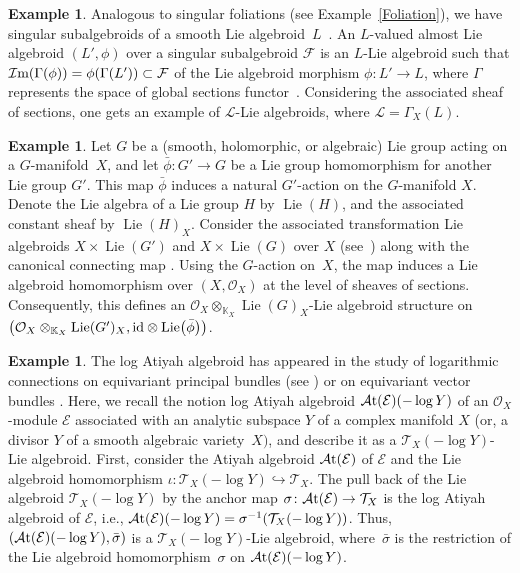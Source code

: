 \documentclass[pdftex]{sigma}
\numberwithin{equation}{section}
\theoremstyle{definition}
\newtheorem{Exm}[Thm]{Example}
\begin{document}
\begin{Exm}
Analogous to singular foliations (see Example~\ref{Foliation}), we have singular subalgebroids of a smooth Lie algebroid~$L$~\cite{MZ}.
An $L$-valued almost Lie algebroid $(L', \phi)$ over a singular subalgebroid $\mathcal{F}$ is
an $L$-Lie algebroid such that $\mathcal{I}{\rm m}(\Gamma(\phi))=\phi(\Gamma(L')) \subset \mathcal{F}$ of the Lie algebroid morphism $\phi\colon L' \rightarrow L$, where $\Gamma$ represents the space of global sections functor~\cite{RL25}. Considering the associated sheaf of sections, one gets an example of $\mathcal{L}$-Lie algebroids, where $\mathcal{L}=\Gamma_X(L)$.
\end{Exm}

\begin{Exm} \label{Lie groups}
Let $G$ be a (smooth, holomorphic, or algebraic) Lie group acting on a $G$-mani\-fold~$X$, and let $\bar{\phi}\colon G' \to G$ be a Lie group homomorphism for another Lie group $G'$. This map $\bar{\phi}$ induces a natural $G'$-action on the $G$-manifold $X$.
	Denote the Lie algebra of a Lie group $H$ by $\operatorname{Lie}(H)$, and the associated constant sheaf by $\operatorname{Lie}(H)_X$. Consider the associated transformation Lie algebroids $X \times \operatorname{Lie}(G')$ and $X \times \operatorname{Lie}(G)$ over $X$ (see~\cite{RF}) along with the canonical connecting map .
	Using the $G$-action on~$X$, the map \smash{$\tilde{\phi}$} induces a Lie algebroid homomorphism over $(X, \mathcal{O}_X)$ at the level of sheaves of sections. Consequently, this defines an $\mathcal{O}_X \otimes_{\mathbb{K}_X} \operatorname{Lie}(G)_X$-Lie algebroid structure on~$\bigl(\mathcal{O}_X \otimes_{\mathbb{K}_X} \operatorname{Lie}(G')_X, {\rm id} \otimes \operatorname{Lie}\bigl(\bar{\phi}\bigr)\bigr)$.
\end{Exm}
\begin{Exm} \label{log Atiyah}
	The log Atiyah algebroid has appeared in the study of logarithmic connections on equivariant principal bundles (see \cite{IBMP, DKP}) or on equivariant vector bundles \cite{IB}. Here, we recall the notion log Atiyah algebroid $\mathcal{A}{\rm t}(\mathcal{E})(-\log Y)$ of an $\mathcal{O}_X$-module $\mathcal{E}$ associated with an analytic subspace $Y$ of a complex manifold $X$ (or, a divisor $Y$ of a smooth algebraic variety~$X)$,
	and describe it as a $\mathcal{T}_X(-\log Y)$-Lie algebroid. First, consider the Atiyah algebroid $\mathcal{A}{\rm t}({\mathcal{E}})$ of $\mathcal{E}$ and the Lie algebroid homomorphism $\iota\colon \mathcal{T}_X(-\log Y) \hookrightarrow \mathcal{T}_X$. The pull back of the Lie algebroid $\mathcal{T}_X(-\log Y)$ by the anchor map $\sigma\colon \mathcal{A}{\rm t}({\mathcal{E}}) \rightarrow \mathcal{T}_X$ is the log Atiyah algebroid of $\mathcal{E}$, i.e., $\mathcal{A}{\rm t}(\mathcal{E})(-\log Y) = \sigma^{-1}(\mathcal{T}_X(-\log Y))$. Thus, $(\mathcal{A}{\rm t}(\mathcal{E})(-\log Y), \bar{\sigma})$ is a $\mathcal{T}_X(-\log Y)$-Lie algebroid, where~$\bar{\sigma}$ is the restriction of the Lie algebroid homomorphism~$\sigma$ on $\mathcal{A}{\rm t}(\mathcal{E})(-\log Y)$.
\end{Exm}
\end{document}
